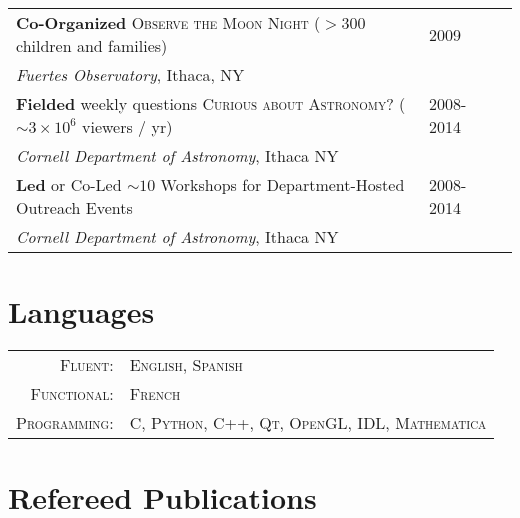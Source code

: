 \documentclass[10pt]{article} %
\begin{document}
\begin{tabular}{l>{\hfill}p{2.7cm}r}
{\bf Co-Organized} \textsc{Observe the Moon Night} ($> 300$ children and families) & 2009\\
{\it Fuertes Observatory}, Ithaca, NY \\
{\bf Fielded} weekly questions \textsc{Curious about Astronomy?}  ($\sim 3\times10^6$ viewers / yr) & 2008-2014\\
{\it Cornell Department of Astronomy}, Ithaca NY \\
{\bf Led} or Co-Led $\sim 10$ Workshops for Department-Hosted Outreach Events & 2008-2014 \\
{\it Cornell Department of Astronomy}, Ithaca NY
\end{tabular}



\section{Languages}

\begin{tabular}{rl}
\textsc{Fluent:} & \textsc{English}, \textsc{Spanish} \\
\textsc{Functional:} & \textsc{French} \\
\textsc{Programming:} & \textsc{C, Python, C++, Qt, OpenGL, IDL, Mathematica} \\
\end{tabular}


\section{Refereed Publications}
\end{document}
